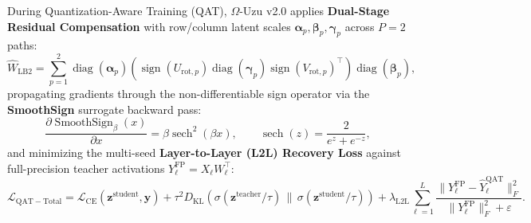 \documentclass[10pt,a4paper]{article}
\begin{document}
During Quantization-Aware Training (QAT), $\Omega$-Uzu v2.0 applies \textbf{Dual-Stage Residual Compensation} with row/column latent scales $\bm{\alpha}_p, \bm{\beta}_p, \bm{\gamma}_p$ across $P=2$ paths:
\begin{equation}
  \widehat{W}_{\mathrm{LB2}} = \sum_{p=1}^{2} \operatorname{diag}(\bm{\alpha}_p) \left( \operatorname{sign}(U_{\mathrm{rot},p}) \operatorname{diag}(\bm{\gamma}_p) \operatorname{sign}(V_{\mathrm{rot},p})^\top \right) \operatorname{diag}(\bm{\beta}_p),
\end{equation}
propagating gradients through the non-differentiable sign operator via the \textbf{SmoothSign} surrogate backward pass:
\begin{equation}
  \frac{\partial \operatorname{SmoothSign}_\beta(x)}{\partial x} = \beta \operatorname{sech}^2(\beta x), \qquad \operatorname{sech}(z) = \frac{2}{e^z + e^{-z}},
\end{equation}
and minimizing the multi-seed \textbf{Layer-to-Layer (L2L) Recovery Loss} against full-precision teacher activations $Y_\ell^{\mathrm{FP}} = X_\ell W_\ell^\top$:
\begin{equation}
  \mathcal{L}_{\mathrm{QAT-Total}} = \mathcal{L}_{\mathrm{CE}}(\mathbf{z}^{\mathrm{student}}, \mathbf{y}) + \tau^2 D_{\mathrm{KL}}\!\left(\sigma(\mathbf{z}^{\mathrm{teacher}}/\tau)\,\|\,\sigma(\mathbf{z}^{\mathrm{student}}/\tau)\right) + \lambda_{\mathrm{L2L}} \sum_{\ell=1}^{L} \frac{\|Y_\ell^{\mathrm{FP}} - \widehat{Y}_\ell^{\mathrm{QAT}}\|_F^2}{\|Y_\ell^{\mathrm{FP}}\|_F^2 + \varepsilon}.
\end{equation}
\end{document}
